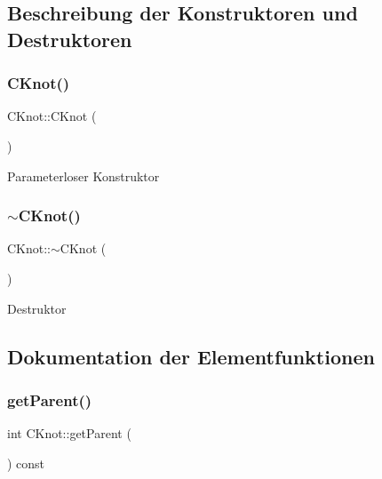 \subsection{Beschreibung der Konstruktoren und Destruktoren}
\mbox{\label{class_c_knot_aebedf7efb952e68b564b0e56300e8135}} 
\subsubsection{\texorpdfstring{C\+Knot()}{CKnot()}}
{\footnotesize\ttfamily C\+Knot\+::\+C\+Knot (\begin{DoxyParamCaption}{ }\end{DoxyParamCaption})}

Parameterloser Konstruktor \mbox{\label{class_c_knot_a8752f1fc4c060fa291a850c9c36889e1}} 
\subsubsection{\texorpdfstring{$\sim$\+C\+Knot()}{~CKnot()}}
{\footnotesize\ttfamily C\+Knot\+::$\sim$\+C\+Knot (\begin{DoxyParamCaption}{ }\end{DoxyParamCaption})\hspace{0.3cm}{\ttfamily [virtual]}}

Destruktor 

\subsection{Dokumentation der Elementfunktionen}
\mbox{\label{class_c_knot_a22a037af3ea6162ff6d380480d568b80}} 
\subsubsection{\texorpdfstring{get\+Parent()}{getParent()}}
{\footnotesize\ttfamily int C\+Knot\+::get\+Parent (\begin{DoxyParamCaption}{ }\end{DoxyParamCaption}) const}

